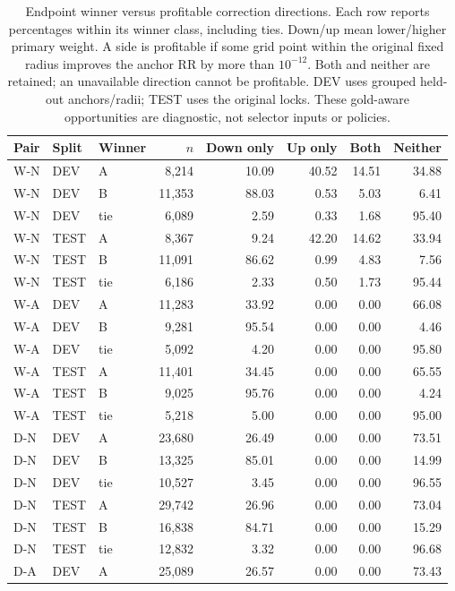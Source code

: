 \begin{table}[htbp]
\centering\footnotesize\setlength{\tabcolsep}{4pt}
\caption{Endpoint winner versus profitable correction directions. Each row reports percentages within its winner class, including ties. Down/up mean lower/higher primary weight. A side is profitable if some grid point within the original fixed radius improves the anchor RR by more than $10^{-12}$. Both and neither are retained; an unavailable direction cannot be profitable. DEV uses grouped held-out anchors/radii; TEST uses the original locks. These gold-aware opportunities are diagnostic, not selector inputs or policies.}
\label{tab:winner-contingency}
\begin{tabular}{lllrrrrr}
\toprule
Pair & Split & Winner & $n$ & Down only & Up only & Both & Neither\\
\midrule
W-N & DEV & A & 8,214 & 10.09 & 40.52 & 14.51 & 34.88\\
W-N & DEV & B & 11,353 & 88.03 & 0.53 & 5.03 & 6.41\\
W-N & DEV & tie & 6,089 & 2.59 & 0.33 & 1.68 & 95.40\\
W-N & TEST & A & 8,367 & 9.24 & 42.20 & 14.62 & 33.94\\
W-N & TEST & B & 11,091 & 86.62 & 0.99 & 4.83 & 7.56\\
W-N & TEST & tie & 6,186 & 2.33 & 0.50 & 1.73 & 95.44\\
W-A & DEV & A & 11,283 & 33.92 & 0.00 & 0.00 & 66.08\\
W-A & DEV & B & 9,281 & 95.54 & 0.00 & 0.00 & 4.46\\
W-A & DEV & tie & 5,092 & 4.20 & 0.00 & 0.00 & 95.80\\
W-A & TEST & A & 11,401 & 34.45 & 0.00 & 0.00 & 65.55\\
W-A & TEST & B & 9,025 & 95.76 & 0.00 & 0.00 & 4.24\\
W-A & TEST & tie & 5,218 & 5.00 & 0.00 & 0.00 & 95.00\\
D-N & DEV & A & 23,680 & 26.49 & 0.00 & 0.00 & 73.51\\
D-N & DEV & B & 13,325 & 85.01 & 0.00 & 0.00 & 14.99\\
D-N & DEV & tie & 10,527 & 3.45 & 0.00 & 0.00 & 96.55\\
D-N & TEST & A & 29,742 & 26.96 & 0.00 & 0.00 & 73.04\\
D-N & TEST & B & 16,838 & 84.71 & 0.00 & 0.00 & 15.29\\
D-N & TEST & tie & 12,832 & 3.32 & 0.00 & 0.00 & 96.68\\
D-A & DEV & A & 25,089 & 26.57 & 0.00 & 0.00 & 73.43\\

\end{tabular}
\end{table}
